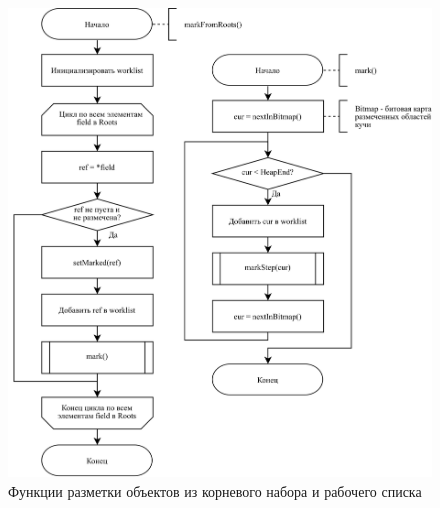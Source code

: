 \begin{figure}[H]
	\centering
	\includegraphics[scale=0.175]{assets/mark-sweep-1.png}
	\caption{Функции разметки объектов из корневого набора и рабочего списка}
	\label{fig:mark-sweep-1}
\end{figure}

